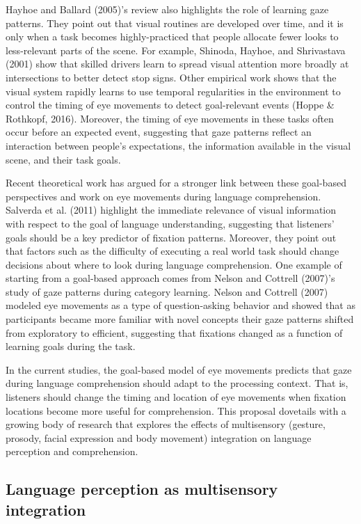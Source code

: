 \documentclass[english,floatsintext,man]{apa6}
\begin{document}
Hayhoe and Ballard (2005)'s review also highlights the role of learning
gaze patterns. They point out that visual routines are developed over
time, and it is only when a task becomes highly-practiced that people
allocate fewer looks to less-relevant parts of the scene. For example,
Shinoda, Hayhoe, and Shrivastava (2001) show that skilled drivers learn
to spread visual attention more broadly at intersections to better
detect stop signs. Other empirical work shows that the visual system
rapidly learns to use temporal regularities in the environment to
control the timing of eye movements to detect goal-relevant events
(Hoppe \& Rothkopf, 2016). Moreover, the timing of eye movements in
these tasks often occur before an expected event, suggesting that gaze
patterns reflect an interaction between people's expectations, the
information available in the visual scene, and their task goals.

Recent theoretical work has argued for a stronger link between these
goal-based perspectives and work on eye movements during language
comprehension. Salverda et al. (2011) highlight the immediate relevance
of visual information with respect to the goal of language
understanding, suggesting that listeners' goals should be a key
predictor of fixation patterns. Moreover, they point out that factors
such as the difficulty of executing a real world task should change
decisions about where to look during language comprehension. One example
of starting from a goal-based approach comes from Nelson and Cottrell
(2007)'s study of gaze patterns during category learning. Nelson and
Cottrell (2007) modeled eye movements as a type of question-asking
behavior and showed that as participants became more familiar with novel
concepts their gaze patterns shifted from exploratory to efficient,
suggesting that fixations changed as a function of learning goals during
the task.

In the current studies, the goal-based model of eye movements predicts
that gaze during language comprehension should adapt to the processing
context. That is, listeners should change the timing and location of eye
movements when fixation locations become more useful for comprehension.
This proposal dovetails with a growing body of research that explores
the effects of multisensory (gesture, prosody, facial expression and
body movement) integration on language perception and comprehension.

\hypertarget{language-perception-as-multisensory-integration}{%
\subsection{Language perception as multisensory
integration}\label{language-perception-as-multisensory-integration}}
\end{document}
